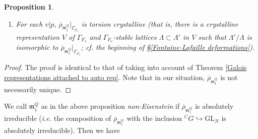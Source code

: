 \documentclass[12pt,oneside,reqno]{amsart}
\theoremstyle{plain}
\newtheorem{proposition}[theorem]{Proposition}
\begin{document}
\begin{proposition}
\begin{enumerate}
			
			
			
			\item 
			For each $v|p$, $\overline{\rho}_{\mathfrak{m}_1^Q}|_{\Gamma_{F_v}}$ is \emph{torsion crystalline} (that is, there is a crystalline representation $V$ of $\Gamma_{F_v}$ and $\Gamma_{F_v}$-stable lattices $\Lambda\subset\Lambda'$ in $V$ such that $\Lambda'/\Lambda$ is isomorphic to $\overline{\rho}_{\mathfrak{m}_1^Q}|_{\Gamma_{F_v}}$; \emph{cf.} the beginning of §\ref{Fontaine-Lafaille deformations}).
			
			
		\end{enumerate}
	\end{proposition}
	\begin{proof}
		The proof is identical to
		that of
		\cite[Proposition 3.4.2]{ClozelHarrisTaylor2008}
		taking into account of
		Theorem
		\ref{Galois representations attached to auto rep}. Note that in our situation, $\overline{\rho}_{\mathfrak{m}_1^Q}$ is not necessarily unique.
	\end{proof}
	
	
	We call
	$\mathfrak{m}_1^Q$
	as in the above proposition
	\emph{non-Eisenstein}
	if
	$\overline{\rho}_{\mathfrak{m}_1^Q}$
	is absolutely irreducible
	(\emph{i.e.}
	the composition of
	$\overline{\rho}_{\mathfrak{m}_1^Q}$
	with the inclusion
	$^CG
	\hookrightarrow
	\mathrm{GL}_N$
	is absolutely irreducible).
	Then 
	we have
	
\end{document}
